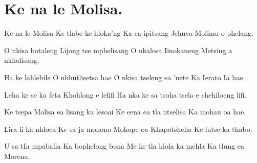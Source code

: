 \starttocol
\chapter{Ke na le Molisa.}
\nexttocol
\hfill{\it }
\stoptocol
\starttocol
\startlines
{\sc Ke} na le Molisa
 Ke tlabe ke hloka'ng
Ka ea ipitsang Jehuva
 Molimu o phelang.

O nkisa botaleng
 Lijong tse mphelisang
O nkalosa Iinokaneng
 Metsing a nkholisang.

Ha ke lahlehile
 O nkhutlisetsa hae
O nkisa tseleng ea 'nete
 Ka Ierato Ia hae.

Leha ke se ka feta
 Khohlong e lefifi
Ha nka ke sa tsoha tsela
  e chehiloeng lifi.

Ke tsepa Molisa
 ea lisang ka lesoai
Ke eena ea tla ntselisa
 Ka mohau oa hae.

Lira li ka nhloea
 Ke sa ja monono
Mohope oa Khapatsheha
 Ke lutse ka thabo.

U sa tIa mpaballa
 Ka bophelong bona
Me ke tla hlola ka mehla
 Ka tlung ea Morena.

\stoplines
\nexttocol

\stoptocol
